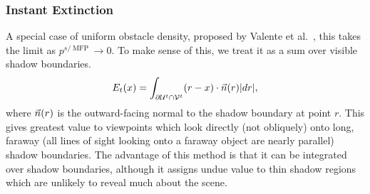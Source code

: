 \subsubsection{Instant Extinction}
A special case of uniform obstacle density, proposed by Valente et al.\ \cite{valenteTS13},
this takes the limit as $p^{s/\operatorname{MFP}}\to0$.
To make sense of this, we treat it as a sum over visible shadow boundaries.
$$E_t(x) = \int_{\partial \mathcal{U}^t \cap \mathcal{V}^t} (r-x)\cdot \vec{n}(r) |dr|,$$
where $\vec{n}(r)$ is the outward-facing normal to the shadow boundary at point $r$.
This gives greatest value to viewpoints which look directly (not obliquely) onto long,
faraway (all lines of sight looking onto a faraway object are nearly parallel) shadow boundaries.
The advantage of this method is that it can be integrated over shadow boundaries,
although it assigns undue value to thin shadow regions which are unlikely to reveal much about the scene.


